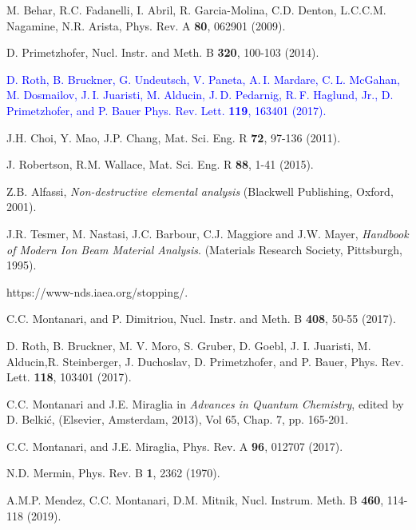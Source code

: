 \documentclass[aps,pra,reprint,superscriptaddress]{revtex4-1}
\def\ale#1{\textcolor{blue}{#1}}
\begin{document}
\begin{thebibliography}{00}
M. Behar, R.C. Fadanelli, I. Abril, R. Garcia-Molina, C.D. Denton, 
L.C.C.M. Nagamine, N.R. Arista, 
Phys. Rev. A \textbf{80},  062901 (2009).

D. Primetzhofer, 
Nucl. Instr. and Meth. B \textbf{320}, 100-103 (2014).

\ale{D. Roth, B. Bruckner, G. Undeutsch, V. Paneta, A. I. Mardare, 
C. L. McGahan, M. Dosmailov, J. I. Juaristi, M. Alducin, 
J. D. Pedarnig, R. F. Haglund, Jr., D. Primetzhofer, and P. Bauer
Phys. Rev. Lett. \textbf{119}, 163401 (2017).}

J.H. Choi, Y. Mao, J.P. Chang, 
Mat. Sci. Eng. R \textbf{72}, 97-136 (2011).

J. Robertson, R.M. Wallace, 
Mat. Sci. Eng. R \textbf{88}, 1-41 (2015).

Z.B. Alfassi,
\textit{Non-destructive elemental analysis}
(Blackwell Publishing, Oxford, 2001).

J.R. Tesmer, M. Nastasi, J.C. Barbour, C.J. Maggiore and J.W. Mayer,
\textit{Handbook of Modern Ion Beam Material Analysis}.
(Materials Research Society, Pittsburgh, 1995).

https://www-nds.iaea.org/stopping/.

C.C. Montanari, and P. Dimitriou, 
Nucl. Instr. and Meth. B \textbf{408},  50-55 (2017).

 D. Roth, B. Bruckner, M. V. Moro, S. Gruber, D. Goebl, J. I. Juaristi, M. Alducin,R. Steinberger, J. Duchoslav, D. Primetzhofer, and P. Bauer, Phys. Rev. Lett. \textbf{118}, 103401 (2017).

C.C. Montanari and J.E. Miraglia in 
\textit{Advances in Quantum Chemistry}, 
edited by D. Belki\'c, (Elsevier, Amsterdam, 2013), Vol 65, Chap. 7, pp. 165-201. 

C.C. Montanari, and J.E. Miraglia, 
Phys. Rev. A \textbf{96}, 012707 (2017).

N.D. Mermin, 
Phys. Rev. B \textbf{1}, 2362 (1970).

A.M.P. Mendez, C.C. Montanari, D.M. Mitnik, 
Nucl. Instrum. Meth. B \textbf{460}, 114-118 (2019).


\end{thebibliography}
\end{document}
